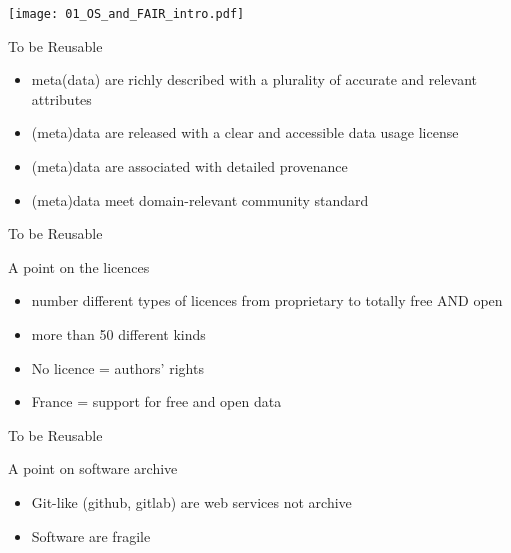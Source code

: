 \begin{frame}
\texttt{[image: 01\_OS\_and\_FAIR\_intro.pdf]}
\end{frame}

\begin{frame}
\begin{block}{To be Reusable}
\begin{itemize}
\item meta(data) are richly described with a plurality of accurate and relevant attributes
\item (meta)data are released with a clear and accessible data usage license
\item (meta)data are associated with detailed provenance
\item (meta)data meet domain-relevant community standard
\end{itemize}
\end{block}
\end{frame}


\begin{frame}{To be Reusable}
\begin{block}{A point on the licences}
\begin{itemize}
\item number different types of licences from proprietary to totally free AND open
\item more than 50 different kinds
\item No licence = authors' rights
\item France = support for free and open data
\end{itemize}
\end{block}
\end{frame}

\begin{frame}{To be Reusable}
\begin{block}{A point on software archive}
\begin{itemize}
\item Git-like (github, gitlab) are web services not archive
\item Software are fragile
\end{itemize}
\end{block}
\end{frame}



